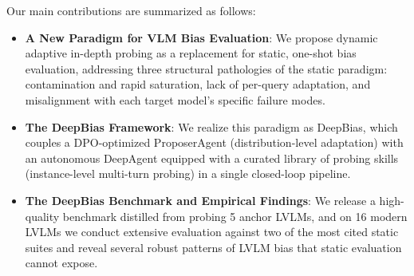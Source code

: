 \documentclass[lettersize,journal]{IEEEtran}
\begin{document}
Our main contributions are summarized as follows:
\begin{itemize}
    \item \textbf{A New Paradigm for VLM Bias Evaluation}: We propose dynamic adaptive in-depth probing as a replacement for static, one-shot bias evaluation, addressing three structural pathologies of the static paradigm: contamination and rapid saturation, lack of per-query adaptation, and misalignment with each target model's specific failure modes.
    \item \textbf{The DeepBias Framework}: We realize this paradigm as DeepBias, which couples a DPO-optimized ProposerAgent (distribution-level adaptation) with an autonomous DeepAgent equipped with a curated library of probing skills (instance-level multi-turn probing) in a single closed-loop pipeline.
    \item \textbf{The DeepBias Benchmark and Empirical Findings}: We release a high-quality benchmark distilled from probing 5 anchor LVLMs, and on 16 modern LVLMs we conduct extensive evaluation against two of the most cited static suites and reveal several robust patterns of LVLM bias that static evaluation cannot expose.
\end{itemize}

\end{document}
